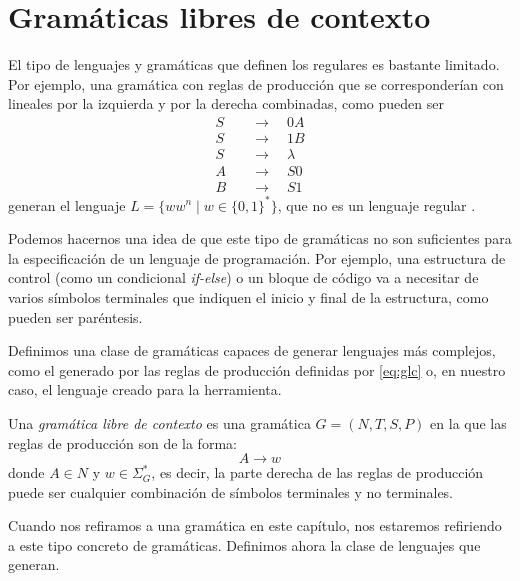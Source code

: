 
\chapter{Gramáticas libres de contexto}\label{chap:CFG}

El tipo de lenguajes y gramáticas que definen los regulares es bastante limitado. Por ejemplo, una gramática con
reglas de producción que se corresponderían con lineales por la izquierda y por la derecha combinadas, como pueden ser
\begin{align}
    S\quad&\to\quad 0A \\
    S\quad&\to\quad 1B \\
    S\quad&\to\quad\lambda \label{eq:glc} \\ 
    A\quad&\to\quad S0 \\
    B\quad&\to\quad S1
\end{align}
generan el lenguaje $L=\{ww^n\mid w\in\{0,1\}^*\}$, que no es un lenguaje regular \cite{pfenning_2000}.

\vspace{10pt}
Podemos hacernos una idea de que este tipo de gramáticas no son suficientes para la especificación de un lenguaje de
programación. Por ejemplo, una estructura de control (como un condicional \textit{if-else}) o un bloque de código va a 
necesitar de varios símbolos terminales que indiquen el inicio y final de la estructura, como pueden ser paréntesis.

\vspace{10pt}
Definimos una clase de gramáticas capaces de generar lenguajes más complejos, como el generado por las reglas de
producción definidas por \eqref{eq:glc} o, en nuestro caso, el lenguaje creado para la herramienta.

\begin{definicion}Una \textit{gramática libre de contexto} es una gramática $G=(N,T,S,P)$
en la que las reglas de producción son de la forma:
\begin{equation}
    A \to w
\end{equation}
donde $A\in N$ y $w\in\Sigma_G^*$, es decir, la parte derecha de las reglas de producción puede ser cualquier
combinación de símbolos terminales y no terminales.
\end{definicion}

Cuando nos refiramos a una gramática en este capítulo, nos estaremos refiriendo a este tipo concreto de gramáticas.
Definimos ahora la clase de lenguajes que generan.

